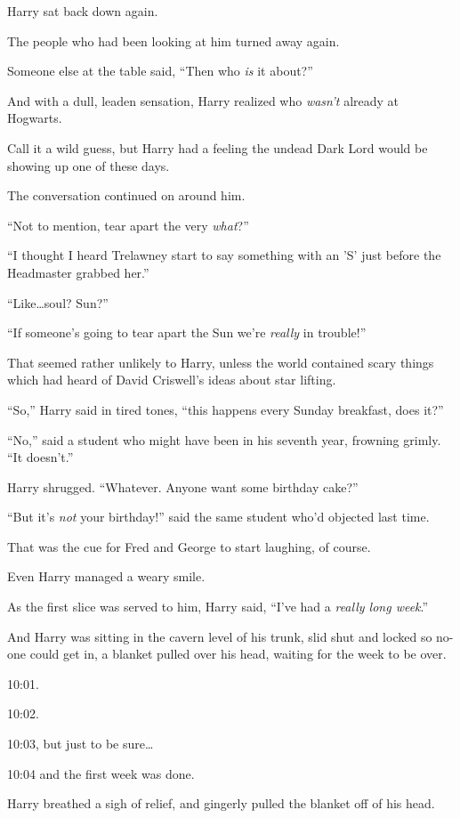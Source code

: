 Harry sat back down again.

The people who had been looking at him turned away again.

Someone else at the table said, “Then who \emph{is} it about?”

And with a dull, leaden sensation, Harry realized who \emph{wasn’t} already at Hogwarts.

Call it a wild guess, but Harry had a feeling the undead Dark Lord would be showing up one of these days.

The conversation continued on around him.

“Not to mention, tear apart the very \emph{what}?”

“I thought I heard Trelawney start to say something with an ’S’ just before the Headmaster grabbed her.”

“Like…soul? Sun?”

“If someone’s going to tear apart the Sun we’re \emph{really} in trouble!”

That seemed rather unlikely to Harry, unless the world contained scary things which had heard of David Criswell’s ideas about star lifting.

“So,” Harry said in tired tones, “this happens every Sunday breakfast, does it?”

“No,” said a student who might have been in his seventh year, frowning grimly. “It doesn’t.”

Harry shrugged. “Whatever. Anyone want some birthday cake?”

“But it’s \emph{not} your birthday!” said the same student who’d objected last time.

That was the cue for Fred and George to start laughing, of course.

Even Harry managed a weary smile.

As the first slice was served to him, Harry said, “I’ve had a \emph{really long week}.”

\later

And Harry was sitting in the cavern level of his trunk, slid shut and locked so no-one could get in, a blanket pulled over his head, waiting for the week to be over.

10:01.

10:02.

10:03, but just to be sure…

10:04 and the first week was done.

Harry breathed a sigh of relief, and gingerly pulled the blanket off of his head.

